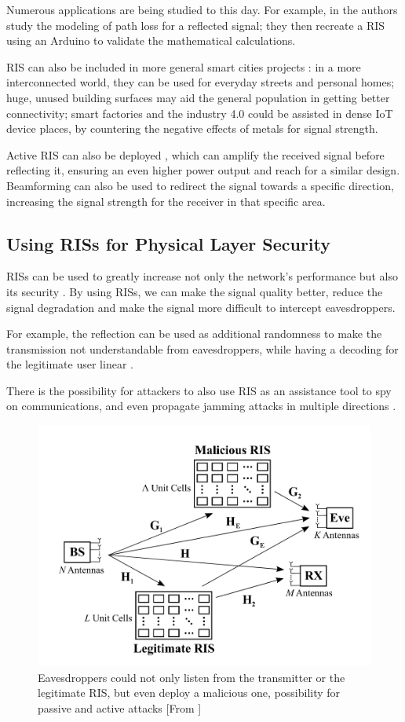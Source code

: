 Numerous applications are being studied to this day. For example, in \cite{9881509} the authors study the modeling of path loss for a reflected signal; they then recreate a RIS using an Arduino to validate the mathematical calculations.

RIS can also be included in more general smart cities projects \cite{9253607}: in a more interconnected world, they can be used for everyday streets and personal homes; huge, unused building surfaces may aid the general population in getting better connectivity; smart factories and the industry 4.0 could be assisted in dense IoT device places, by countering the negative effects of metals for signal strength.

Active RIS can also be deployed \cite{9377648}, which can amplify the received signal before reflecting it, ensuring an even higher power output and reach for a similar design. Beamforming can also be used to redirect the signal towards a specific direction, increasing the signal strength for the receiver in that specific area.

\subsection{Using RISs for Physical Layer Security}

RISs can be used to greatly increase not only the network's performance but also its security \cite{10409564}. By using RISs, we can make the signal quality better, reduce the signal degradation and make the signal more difficult to intercept eavesdroppers.

For example, the reflection can be used as additional randomness to make the transmission not understandable from eavesdroppers, while having a decoding for the legitimate user linear \cite{9328149}.

There is the possibility for attackers to also use RIS as an assistance tool to spy on communications, and even propagate jamming attacks in multiple directions \cite{10143983}.

\begin{figure}[H]
  \centering
  \includegraphics[width=0.5\linewidth]{imgs/RIS malicious.png}
  \caption{Eavesdroppers could not only listen from the transmitter or the legitimate RIS, but even deploy a malicious one, possibility for passive and active attacks [From \cite{10143983}]}
\end{figure}

